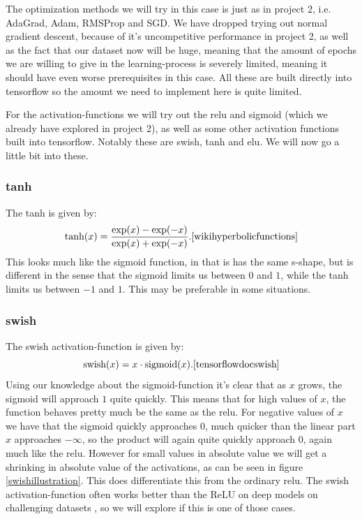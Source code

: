 \documentclass{article}
\begin{document}
The optimization methods we will try in this case is just as in project 2, i.e.
AdaGrad, Adam, RMSProp and SGD. We have dropped trying out normal gradient
descent, because of it's uncompetitive performance in project 2, as well as the
fact that our dataset now will be huge, meaning that the amount of epochs we
are willing to give in the learning-process is severely limited, meaning it
should have even worse prerequisites in this case. All these are built directly
into tensorflow so the amount we need to implement here is quite limited.

For the activation-functions we will try out the relu and sigmoid (which we
already have explored in project 2), as well as some other activation functions
built into tensorflow. Notably these are swish, tanh and elu. We will now go a
little bit into these.

\subsubsection{tanh}
The tanh is given by:
\[
	\text{tanh}(x) = \frac{\exp(x) - \exp(-x)}{\exp(x) + \exp(-x)}. \cite{wikihyperbolicfunctions}
\]
This looks much like the sigmoid function, in that is has the same s-shape, but
is different in the sense that the sigmoid limits us between $0$ and $1$, while
the tanh limits us between $-1$ and $1$. This may be preferable in some situations.

\subsubsection{swish}
The swish activation-function is given by:
\[
	\text{swish}(x) = x \cdot \text{sigmoid}(x). \cite{tensorflowdocswish}
\]
Using our knowledge about the sigmoid-function it's clear that as $x$ grows, the
sigmoid will approach $1$ quite quickly. This means that for high values of $x$,
the function behaves pretty much be the same as the relu. For negative values of
$x$ we have that the sigmoid quickly approaches $0$, much quicker than the
linear part $x$ approaches $-\infty$, so the product will again quite quickly
approach $0$, again much like the relu. However for small values in absolute
value we will get a shrinking in absolute value of the activations, as can be
seen in figure \ref{swishillustration}. This does differentiate this from the
ordinary relu. The swish activation-function often works better than the ReLU on
deep models on challenging datasets \cite{ramachandran2017searching}, so we will
explore if this is one of those cases.
\end{document}

